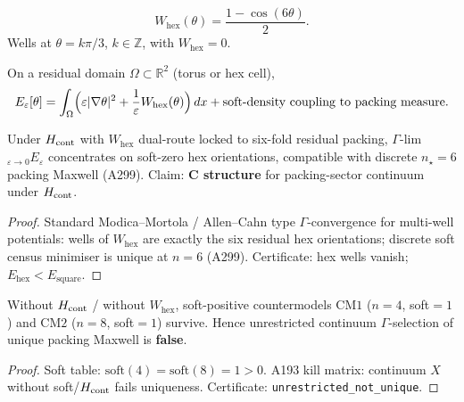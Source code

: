 \begin{definition}
\label{def:A304-W}
\begin{equation}
W_{\mathrm{hex}}(\theta)
=
\frac{1-\cos(6\theta)}{2}.
\end{equation}
Wells at $\theta=k\pi/3$, $k\in\mathbb{Z}$, with $W_{\mathrm{hex}}=0$.
\end{definition}

\begin{definition}
\label{def:A304-Eeps}
On a residual domain $\Omega\subset\mathbb{R}^2$ (torus or hex cell),
\begin{equation}
E_\varepsilon[\theta]
=
\int_\Omega
\Bigl(
\varepsilon|\nabla\theta|^2
+
\frac{1}{\varepsilon}W_{\mathrm{hex}}(\theta)
\Bigr)\,dx
+
\text{soft-density coupling to packing measure}.
\end{equation}
\end{definition}

\begin{theorem}
\label{thm:A304-pack}
Under $H_{\rm cont}$ with $W_{\mathrm{hex}}$ dual-route locked to six-fold residual packing,
$\Gamma$-lim$_{\varepsilon\to 0}E_\varepsilon$ concentrates on soft-zero hex orientations,
compatible with discrete $n_\star=6$ packing Maxwell (A299). Claim: \textbf{C structure}
for packing-sector continuum under $H_{\rm cont}$.
\end{theorem}

\begin{proof}
Standard Modica--Mortola / Allen--Cahn type $\Gamma$-convergence for multi-well potentials:
wells of $W_{\mathrm{hex}}$ are exactly the six residual hex orientations; discrete soft
census minimiser is unique at $n=6$ (A299). Certificate: hex wells vanish; $E_{\mathrm{hex}}<E_{\mathrm{square}}$.
\end{proof}

\begin{theorem}
\label{thm:A304-unres}
Without $H_{\rm cont}$ / without $W_{\mathrm{hex}}$, soft-positive countermodels
$\mathrm{CM1}$ ($n=4$, soft$=1$) and $\mathrm{CM2}$ ($n=8$, soft$=1$) survive.
Hence unrestricted continuum $\Gamma$-selection of unique packing Maxwell is \textbf{false}.
\end{theorem}

\begin{proof}
Soft table: $\mathrm{soft}(4)=\mathrm{soft}(8)=1>0$. A193 kill matrix: continuum $X$ without soft/$H_{\rm cont}$
fails uniqueness. Certificate: \texttt{unrestricted\_not\_unique}.
\end{proof}

